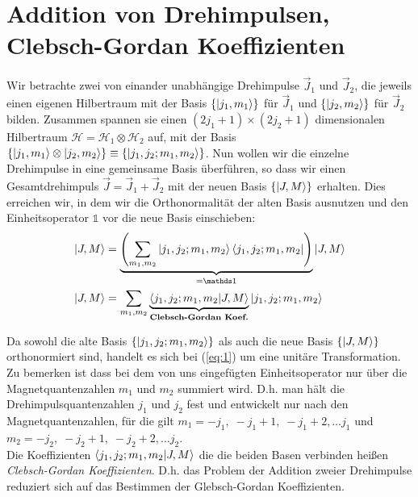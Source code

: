 







\section*{Addition von Drehimpulsen, Clebsch-Gordan Koeffizienten}
\label{sec:addit-von-dreh}

Wir betrachte zwei von einander unabhängige Drehimpulse \(\vec J_1\) und \(\vec
J_2\), die jeweils einen eigenen Hilbertraum mit der Basis \(\{\left| j_1,m_1 \right\rangle\}\)
für \(\vec J_1\) und \(\{\left| j_2,m_2 \right\rangle\}\) für \(\vec J_2\) bilden. Zusammen
spannen sie einen \((2j_1+1) \times (2j_2+1)\) dimensionalen Hilbertraum
\(\mathcal H = \mathcal H_1 \otimes \mathcal H_2\) auf, mit der Basis
\(\{\left| j_1,m_1 \right\rangle \otimes \left| j_2,m_2 \right\rangle\} \equiv \{\left| j_1,j_2;m_1,m_2 \right\rangle\}\).
Nun wollen wir die einzelne Drehimpulse in eine gemeinsame Basis überführen, so
dass wir einen Gesamtdrehimpuls \(\vec J=\vec J_1+\vec J_2\) mit der neuen Basis
\(\{\left| J,M \right\rangle\}\) erhalten. Dies erreichen wir, in dem wir die Orthonormalität
der alten Basis ausnutzen und den Einheitsoperator \(\mathds 1\) vor die neue
Basis einschieben:
\begin{align}
  \label{eq:1}
  \ket{J,M}&=\underbrace{\left(
      \sum_{m_1,m_2}\ket{j_1,j_2;m_1,m_2}\bra{j_1,j_2;m_1,m_2}
    \right)}_{= \mathds 1}
  \ket{J,M}\notag\\
   \ket{J,M}&= \sum_{m_1,m_2} 
   \underbrace{\braket{j_1,j_2;m_1,m_2}{J,M}}_
   {\text{\textbf{Clebsch-Gordan Koef.}}}
   \ket{j_1,j_2;m_1,m_2}
\end{align}

Da sowohl die alte Basis \( \{\left| j_1,j_2;m_1,m_2 \right\rangle\}\) als auch die neue Basis
\(\{\left| J,M \right\rangle\}\) orthonormiert sind, handelt es sich bei (\ref{eq:1}) um eine
unitäre Transformation. Zu bemerken ist dass bei dem von uns eingefügten
Einheitsoperator nur über die Magnetquantenzahlen \(m_1\) und \(m_2\) summiert
wird. D.h. man hält die Drehimpulsquantenzahlen \(j_1\) und \(j_2\) fest und
entwickelt nur nach den Magnetquantenzahlen, für die gilt \(m_1 = -j_1,\; -j_1+1,
\;-j_1+2, \dots j_1\) und \(m_2 = -j_2, \;-j_2+1,\;-j_2+2, \dots j_2\).\\
Die Koeffizienten \( \braket{j_1,j_2;m_1,m_2}{J,M} \) die die beiden Basen verbinden
heißen \emph{Clebsch-Gordan Koeffizienten}. D.h. das Problem der Addition zweier
Drehimpulse reduziert sich auf das Bestimmen der Glebsch-Gordan Koeffizienten.

